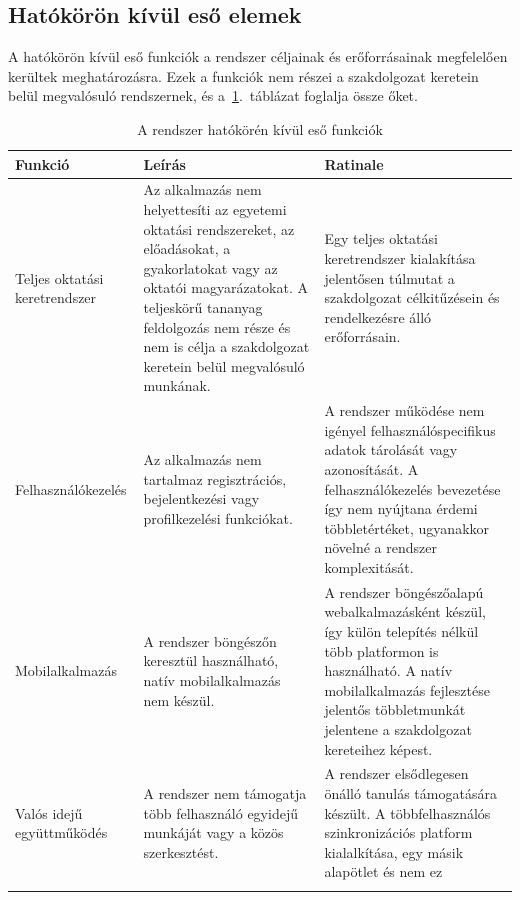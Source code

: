 \documentclass[12pt,a4paper]{report}
\begin{document}
\subsection{Hatókörön kívül eső elemek}
A hatókörön kívül eső funkciók a rendszer céljainak és 
erőforrásainak megfelelően kerültek meghatározásra. 
Ezek a funkciók nem részei a szakdolgozat keretein belül 
megvalósuló rendszernek, és a~\ref{tab:out_of_scope}.~táblázat foglalja össze őket.
\begin{table}[htbp] 
      \centering 
      \begin{tabularx}{\textwidth}{l X X} 
            \toprule 
            \textbf{Funkció} & \textbf{Leírás} & \textbf{Ratinale} \\ 
            \midrule
            Teljes oktatási keretrendszer &
            Az alkalmazás nem helyettesíti az egyetemi oktatási
            rendszereket, az előadásokat, a gyakorlatokat vagy az oktatói
            magyarázatokat. A teljeskörű tananyag feldolgozás nem része és nem is célja a szakdolgozat keretein belül megvalósuló munkának.
            & Egy teljes oktatási keretrendszer kialakítása jelentősen túlmutat a szakdolgozat célkitűzésein és rendelkezésre álló erőforrásain. \\
                  \addlinespace
            Felhasználókezelés &
            Az alkalmazás nem tartalmaz regisztrációs, bejelentkezési vagy
            profilkezelési funkciókat. & A rendszer működése nem igényel felhasználóspecifikus adatok tárolását vagy azonosítását. A felhasználókezelés bevezetése így nem nyújtana érdemi többletértéket, ugyanakkor növelné a rendszer komplexitását.  \\
                  \addlinespace
            Mobilalkalmazás &
            A rendszer böngészőn keresztül használható, natív
            mobilalkalmazás nem készül.  & A rendszer böngészőalapú webalkalmazásként készül, így külön telepítés nélkül több platformon is használható. A natív mobilalkalmazás fejlesztése jelentős többletmunkát jelentene a szakdolgozat kereteihez képest.\\ \addlinespace
                  \addlinespace
            Valós idejű együttműködés &
            A rendszer nem támogatja több felhasználó egyidejű munkáját
            vagy a közös szerkesztést. & A rendszer elsődlegesen önálló tanulás támogatására készült. A többfelhasználós szinkronizációs platform kialalkítása, egy másik alapötlet és nem ez \\
            \addlinespace
            \bottomrule
      \end{tabularx}
      \caption{A rendszer hatókörén kívül eső funkciók}
      \label{tab:out_of_scope}
\end{table}
\end{document}
